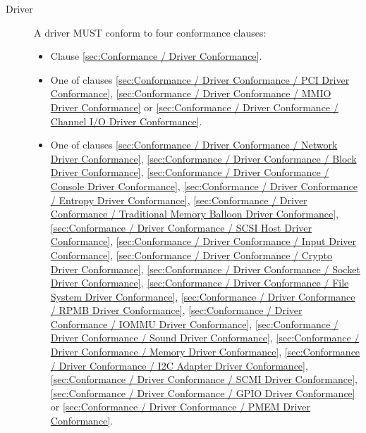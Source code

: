 \begin{description}
\item[Driver] A driver MUST conform to four conformance clauses:
  \begin{itemize}
    \item Clause \ref{sec:Conformance / Driver Conformance}.
    \item One of clauses \ref{sec:Conformance / Driver Conformance / PCI Driver Conformance}, \ref{sec:Conformance / Driver Conformance / MMIO Driver Conformance} or \ref{sec:Conformance / Driver Conformance / Channel I/O Driver Conformance}.
    \item One of clauses
\ref{sec:Conformance / Driver Conformance / Network Driver Conformance},
\ref{sec:Conformance / Driver Conformance / Block Driver Conformance},
\ref{sec:Conformance / Driver Conformance / Console Driver Conformance},
\ref{sec:Conformance / Driver Conformance / Entropy Driver Conformance},
\ref{sec:Conformance / Driver Conformance / Traditional Memory Balloon Driver Conformance},
\ref{sec:Conformance / Driver Conformance / SCSI Host Driver Conformance},
\ref{sec:Conformance / Driver Conformance / Input Driver Conformance},
\ref{sec:Conformance / Driver Conformance / Crypto Driver Conformance},
\ref{sec:Conformance / Driver Conformance / Socket Driver Conformance},
\ref{sec:Conformance / Driver Conformance / File System Driver Conformance},
\ref{sec:Conformance / Driver Conformance / RPMB Driver Conformance},
\ref{sec:Conformance / Driver Conformance / IOMMU Driver Conformance},
\ref{sec:Conformance / Driver Conformance / Sound Driver Conformance},
\ref{sec:Conformance / Driver Conformance / Memory Driver Conformance},
\ref{sec:Conformance / Driver Conformance / I2C Adapter Driver Conformance},
\ref{sec:Conformance / Driver Conformance / SCMI Driver Conformance},
\ref{sec:Conformance / Driver Conformance / GPIO Driver Conformance} or
\ref{sec:Conformance / Driver Conformance / PMEM Driver Conformance}.


\end{itemize}
\end{description}
